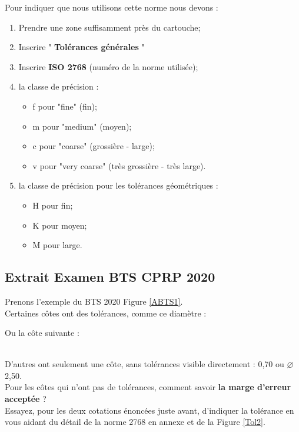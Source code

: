 \documentclass[
	11pt, %
	fleqn, %
	a4paper, %
]{LegrandOrangeBook}
\begin{document}
Pour indiquer que nous utilisons cette norme nous devons :\\
\begin{enumerate}
    \item  Prendre une zone suffisamment près du	cartouche;
    \item Inscrire " \textbf{Tolérances générales} " 
    \item Inscrire \textbf{ISO	2768}	(numéro de la norme utilisée);
    \item la classe de précision :
          \begin{itemize} 
            \item f pour "fine" (fin);
            \item m pour "medium" (moyen);
            \item c pour "coarse" (grossière - large);
            \item v pour "very coarse" (très grossière - très large).
           \end{itemize}
        \item la classe	de	précision pour les	tolérances géométriques :
         \begin{itemize}           
                \item H pour fin;
                \item K pour moyen;
                \item M pour large.
            \end{itemize}
\end{enumerate}


\subsection*{Extrait Examen BTS CPRP 2020}

Prenons l'exemple du BTS 2020 Figure \ref{ABTS1}.\\ 
Certaines côtes ont des tolérances, comme ce diamètre :    

\vspace{0.5 cm}

Ou la côte suivante : 
 \\
D'autres ont seulement une côte, sans tolérances visible directement : 0,70 ou $\varnothing$2,50.\\
Pour les côtes qui n'ont pas de tolérances, comment savoir \textbf{la marge d'erreur acceptée} ?\\
Essayez, pour les deux cotations énoncées juste avant, d'indiquer la tolérance en vous aidant du détail de la norme 2768 en annexe et de la Figure \ref{Tol2}.
\end{document}
